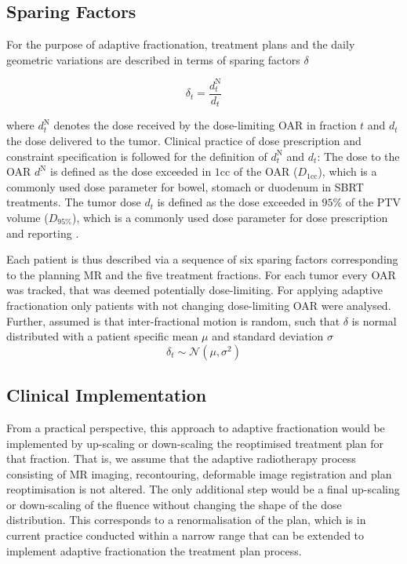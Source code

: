 \documentclass[\relativeRoot/ada.tex]{subfiles}
\begin{document}
\subsection{Sparing Factors}\label{sec:sparing_factors}
For the purpose of adaptive fractionation, treatment plans and the daily geometric variations are described in terms of sparing factors $\delta$

\begin{equation*}
    \delta_{t} = \frac{d_{t}^{\text{N}}}{d_{t}}
\end{equation*}

where $d_{t}^{\text{N}}$ denotes the dose received by the dose-limiting OAR in fraction $t$ and $d_{t}$ the dose delivered to the tumor. Clinical practice of dose prescription and constraint specification is followed for the definition of $d_{t}^{\text{N}}$ and $d_{t}$: The dose to the OAR $d^{\text{N}}$ is defined as the dose exceeded in $1$cc of the OAR ($D_{1\text{cc}}$), which is a commonly used dose parameter for bowel, stomach or duodenum in SBRT treatments. The tumor dose $d_{t}$ is defined as the dose exceeded in $95\%$ of the PTV volume ($D_{95\%}$), which is a commonly used dose parameter for dose prescription and reporting \cite{ICRU50}\cite{ICRU62}.

Each patient is thus described via a sequence of six sparing factors corresponding to the planning MR and the five treatment fractions. For each tumor every OAR was tracked, that was deemed potentially dose-limiting. For applying adaptive fractionation only patients with not changing dose-limiting OAR were analysed. Further, assumed is that inter-fractional motion is random, such that $\delta$ is normal distributed with a patient specific mean $\mu$ and standard deviation $\sigma$
\begin{equation*}
\delta_t \sim \mathcal{N}(\mu,\sigma^2)
\end{equation*}

\subsection{Clinical Implementation}

From a practical perspective, this approach to adaptive fractionation would be implemented by up-scaling or down-scaling the reoptimised treatment plan for that fraction. That is, we assume that the adaptive radiotherapy process consisting of MR imaging, recontouring, deformable image registration and plan reoptimisation is not altered. The only additional step would be a final up-scaling or down-scaling of the fluence without changing the shape of the dose distribution. This corresponds to a renormalisation of the plan, which is in current practice conducted within a narrow range that can be extended to implement adaptive fractionation the treatment plan process.
\end{document}
